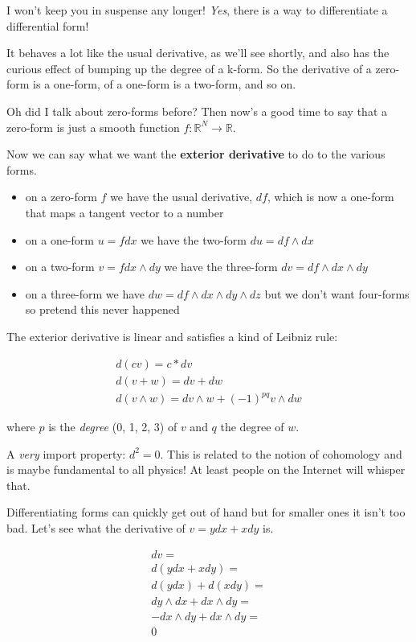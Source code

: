 \documentclass{article}
\begin{document}
I won't keep you in suspense any longer! \textit{Yes}, there is a way to
differentiate a differential form!

It behaves a lot like the usual derivative, as we'll see shortly, and also has
the curious effect of bumping up the degree of a k-form. So the derivative of a
zero-form is a one-form, of a one-form is a two-form, and so on.

Oh did I talk about zero-forms before? Then now's a good time to say that a
zero-form is just a smooth function $f : \mathbb{R}^{N} \to \mathbb{R}$.

Now we can say what we want the \textbf{exterior derivative} to do to the
various forms.

\begin{itemize}
  \item on a zero-form $f$ we have the usual derivative, $df$, which is
    now a one-form that maps a tangent vector to a number
  \item on a one-form $u = f dx$ we have the two-form $du = df \wedge dx$
  \item on a two-form $v = f dx \wedge dy$ we have the three-form $dv = df \wedge dx \wedge
    dy$
  \item on a three-form we have $dw = df \wedge dx \wedge dy \wedge dz$ but
    we don't want four-forms so pretend this never happened
\end{itemize}

The exterior derivative is linear and satisfies a kind of Leibniz rule:

\begin{gather*}
  d(cv) = c * dv \\
  d(v + w) = dv + dw \\
  d(v \wedge w) = dv \wedge w + (-1)^{pq} v \wedge dw
\end{gather*}

where $p$ is the \textit{degree} (0, 1, 2, 3) of $v$ and $q$ the degree of $w$.

A \textit{very} import property: $d^{2} = 0$. This is related to the notion of
cohomology and is maybe fundamental to all physics! At least people on the
Internet will whisper that.

Differentiating forms can quickly get out of hand but for smaller ones it isn't
too bad. Let's see what the derivative of $v = ydx + xdy$ is.

\begin{align*}
  dv = \\
  d(ydx + xdy) = \\
  d(ydx) + d(xdy) = \\
  dy \wedge dx + dx \wedge dy = \\
  -dx \wedge dy + dx \wedge dy = \\
  0
\end{align*}
\end{document}
